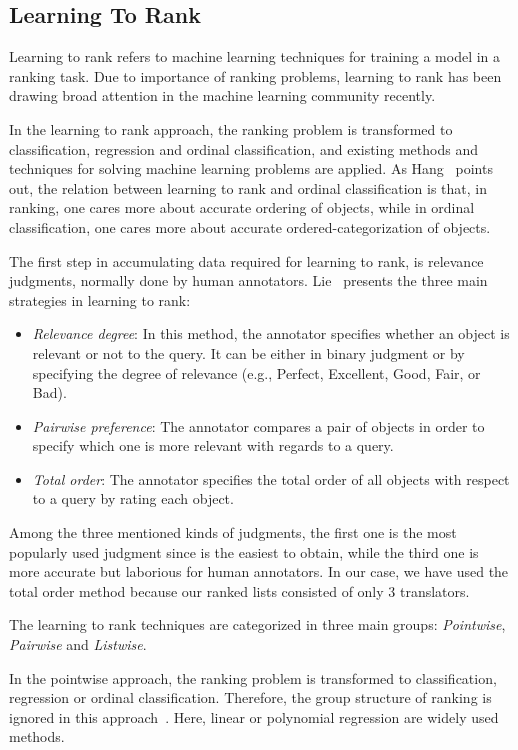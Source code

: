 \subsection{Learning To Rank}
Learning to rank refers to machine learning techniques for training a model in a ranking task. Due to importance of ranking problems, learning to rank has been drawing broad attention in the machine learning community recently. 

In the learning to rank approach, the ranking problem is transformed to classification, regression and ordinal classification, and existing methods and techniques for solving machine learning problems are applied. As Hang~\cite{l2r-intro} points out, the relation between learning to rank and ordinal classification is that, in ranking, one cares more about accurate ordering of objects, while in ordinal classification, one cares more about accurate ordered-categorization of objects.

The first step in accumulating data required for learning to rank, is relevance judgments, normally done by human annotators. Lie~\cite{l2r-book} presents the three main strategies in learning to rank:
\begin{itemize}
\item \textit{Relevance degree}: In this method, the annotator specifies whether an object is relevant or not to the query. It can be either in binary judgment or by specifying the degree of relevance (e.g., Perfect, Excellent, Good, Fair, or Bad).
\item \textit{Pairwise preference}: The annotator compares a pair of objects in order to specify which one is more relevant with regards to a query.
\item \textit{Total order}: The annotator specifies the total order of all objects with respect to a query by rating each object.
\end{itemize}

Among the three mentioned kinds of judgments, the first one is the most popularly used judgment since is the easiest to obtain, while the third one is more accurate but laborious for human annotators. In our case, we have used the total order method because our ranked lists consisted of only 3 translators.

The learning to rank techniques are categorized in three main groups: \textit{Pointwise}, \textit{Pairwise} and \textit{Listwise}.

In the pointwise approach, the ranking problem is transformed to classification, regression or ordinal classification. Therefore, the group structure of ranking is ignored in this approach~\cite{l2r-intro}. Here, linear or polynomial regression are widely used methods.

